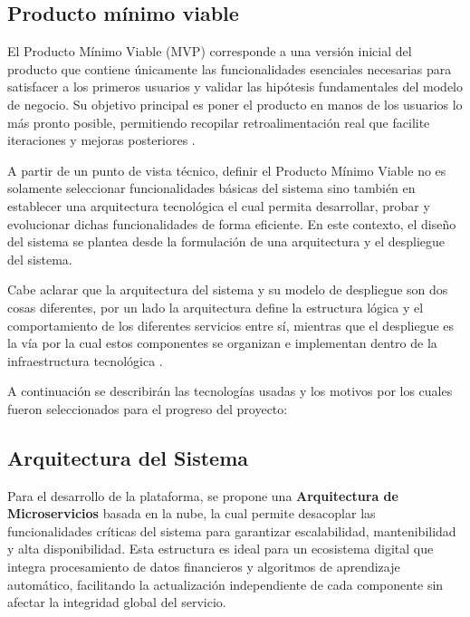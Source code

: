 \subsection*{Producto mínimo viable}

El Producto Mínimo Viable (MVP) corresponde a una versión inicial del producto que contiene únicamente las funcionalidades esenciales necesarias para satisfacer a los primeros usuarios y validar las hipótesis fundamentales del modelo de negocio. Su objetivo principal es poner el producto en manos de los usuarios lo más pronto posible, permitiendo recopilar retroalimentación real que facilite iteraciones y mejoras posteriores \parencite{IntuitChamp01}.

A partir de un punto de vista técnico, definir el Producto Mínimo Viable no es solamente seleccionar funcionalidades básicas del sistema sino también en establecer una arquitectura tecnológica el cual permita desarrollar, probar y evolucionar dichas funcionalidades de forma eficiente. En este contexto, el diseño del sistema se plantea desde la formulación de una arquitectura y el despliegue del sistema.

Cabe aclarar que la arquitectura del sistema y su modelo de despliegue son dos cosas diferentes, por un lado la arquitectura define la estructura lógica y el comportamiento de los diferentes servicios entre sí, mientras que el despliegue es la vía por la cual estos componentes se organizan e implementan dentro de la infraestructura tecnológica \parencite{BBVA04}.

A continuación se describirán las tecnologías usadas y los motivos por los cuales fueron seleccionados para el progreso del proyecto:

\subsection*{Arquitectura del Sistema}

Para el desarrollo de la plataforma, se propone una \textbf{Arquitectura de Microservicios} basada en la nube, la cual permite desacoplar las funcionalidades críticas del sistema para garantizar escalabilidad, mantenibilidad y alta disponibilidad. Esta estructura es ideal para un ecosistema digital que integra procesamiento de datos financieros y algoritmos de aprendizaje automático, facilitando la actualización independiente de cada componente sin afectar la integridad global del servicio.

